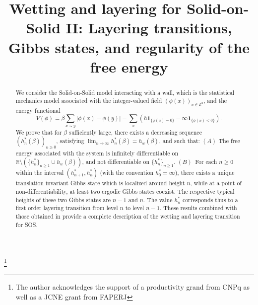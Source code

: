 \documentclass[JEP,XML,SOM,Unicode, NoFloatCountersInSection]{cedram}
\numberwithin{equation}{section}
\theoremstyle{plain}
\theoremstyle{definition}
\begin{document}
\title[Wetting and layering for SOS II]{Wetting and layering for Solid-on-Solid II: Layering transitions, Gibbs states, and regularity
of the free energy}

\author[\initial{H.} \lastname{Lacoin}]{ }
\address{IMPA, Institudo de Matemática Pura e Aplicada\\
Estrada Dona Castorina 110, Rio de Janeiro, CEP-22460-320, Brasil}

\thanks{The author acknowledges the support of a productivity grand from CNPq as well as a JCNE grant from FAPERJ}

\begin{abstract}
We consider the Solid-on-Solid model interacting with a wall, which is the statistical mechanics model associated with the integer-valued field $(\phi(x))_{x\in \mathbb{Z}^2}$, and the energy functional
\[
V(\phi)=\beta \sum_{x\sim y}|\phi(x)-\phi(y)|-\sum_{x}\left(h\mathbf{1}_{\{\phi(x)=0\}}-\infty\mathbf{1}_{\{\phi(x)<0\}} \right).
\]
We prove that for $\beta$ sufficiently large, there exists a decreasing sequence $(h^*_n(\beta))_{n\ge 0}$, satisfying $\lim_{n\to\infty}h^*_n(\beta)=h_w(\beta)$, and such that: $(A)$ The free energy associated with the system is infinitely differentiable on $\mathbb{R} \setminus \left(\{h^*_n\}_{n\ge 1}\cup h_w(\beta)\right)$, and not differentiable on $\{h^*_n\}_{n\ge 1}$. $(B)$~For each $n\ge 0$ within the interval $(h^*_{n+1},h^*_n)$ (with the convention $h^*_0=\infty$), there exists a unique translation invariant Gibbs state which is localized around height $n$, while at a point of non-differentiability, at least two ergodic Gibbs states coexist. The respective typical heights of these two Gibbs states are $n-1$ and $n$. The value $h^*_n$ corresponds thus to a first order layering transition from level $n$ to level $n-1$. These results combined with those obtained in \cite{cf:part1} provide a complete description of the wetting and layering transition for SOS.
\end{abstract}



\end{document}
